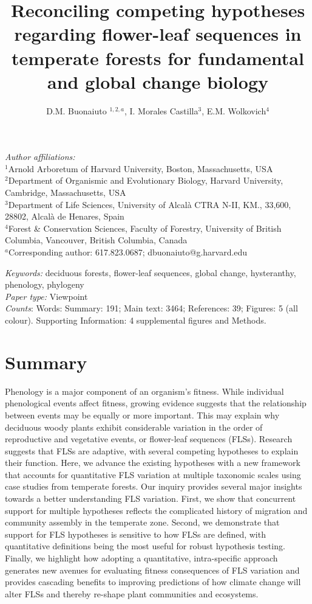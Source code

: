\documentclass[12pt]{article}
\title{Reconciling competing hypotheses regarding flower-leaf sequences in temperate forests for fundamental and global change biology}
\date{}
\author{D.M. Buonaiuto $^{1,2,a}$, I. Morales Castilla$^{3}$, E.M. Wolkovich$^{4}$}
\begin{document}
\maketitle

\noindent \emph{Author affiliations:}\\
\noindent $^1$Arnold Arboretum of Harvard University, Boston, Massachusetts, USA\\
$^2$Department of Organismic and Evolutionary Biology, Harvard University, Cambridge, Massachusetts, USA\\
$^3$Department of Life Sciences, University of Alcal\`a CTRA N-II, KM., 33,600, 28802, Alcal\`a de Henares, Spain\\
$^4$Forest \& Conservation Sciences, Faculty of Forestry, University of British Columbia, Vancouver, British Columbia, Canada\\
$^a$Corresponding author: 617.823.0687; dbuonaiuto@g.harvard.edu

\noindent \emph{Keywords:} deciduous forests, flower-leaf sequences, global change, hysteranthy, phenology, phylogeny \\ %
\emph{Paper type:} Viewpoint\\
 \emph{Counts}: Words: Summary: 191; Main text: 3464; References: 39;  Figures: 5 (all colour). Supporting Information: 4 supplemental figures and Methods.
\newpage

\section*{Summary}
Phenology is a major component of an organism's fitness. While individual phenological events affect fitness, growing evidence suggests that the relationship between events may be equally or more important. This may explain why deciduous woody plants exhibit considerable variation in the order of reproductive and vegetative events, or flower-leaf sequences (FLSs). Research suggests that FLSs are adaptive, with several competing hypotheses to explain their function. Here, we advance the existing hypotheses with a new framework that accounts for quantitative FLS variation at multiple taxonomic scales using case studies from temperate forests. Our inquiry provides several major insights towards a better understanding FLS variation. First, we show that %
concurrent support for multiple hypotheses reflects the complicated history of migration and community assembly in the temperate zone. Second, we demonstrate that support for FLS hypotheses is sensitive to how FLSs are defined, with quantitative definitions being the most useful for robust hypothesis testing. Finally, we highlight how adopting a quantitative, intra-specific approach generates new avenues for evaluating fitness consequences of FLS variation and provides cascading benefits to improving predictions of how climate change will alter FLSs and thereby re-shape plant communities and ecosystems.
\end{document}

